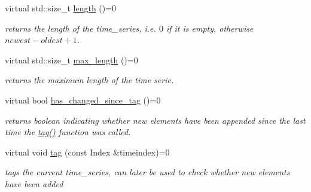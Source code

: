 \begin{DoxyCompactItemize}
\mbox{\label{classtime__series_1_1TimeSeriesInterface_a90f6ed15d82006dbc7ef7783d9f6ff7a}} 
virtual std\+::size\+\_\+t \hyperlink{classtime__series_1_1TimeSeriesInterface_a90f6ed15d82006dbc7ef7783d9f6ff7a}{length} ()=0
\begin{DoxyCompactList}\small\item\em returns the length of the time\+\_\+series, i.\+e. $0$ if it is empty, otherwise $newest - oldest +1 $. \end{DoxyCompactList}\item 
virtual std\+::size\+\_\+t \hyperlink{classtime__series_1_1TimeSeriesInterface_aded8927e82c060aa3367f17dfd59a8ec}{max\+\_\+length} ()=0
\begin{DoxyCompactList}\small\item\em returns the maximum length of the time serie. \end{DoxyCompactList}\item 
\mbox{\label{classtime__series_1_1TimeSeriesInterface_a2758b463ea41393a24ea37ccd0f5feb4}} 
virtual bool \hyperlink{classtime__series_1_1TimeSeriesInterface_a2758b463ea41393a24ea37ccd0f5feb4}{has\+\_\+changed\+\_\+since\+\_\+tag} ()=0
\begin{DoxyCompactList}\small\item\em returns boolean indicating whether new elements have been appended since the last time the \hyperlink{classtime__series_1_1TimeSeriesInterface_a34e881c9496901127baf1d907d7399ac}{tag()} function was called. \end{DoxyCompactList}\item 
\mbox{\label{classtime__series_1_1TimeSeriesInterface_a34e881c9496901127baf1d907d7399ac}} 
virtual void \hyperlink{classtime__series_1_1TimeSeriesInterface_a34e881c9496901127baf1d907d7399ac}{tag} (const Index \&timeindex)=0
\begin{DoxyCompactList}\small\item\em tags the current time\+\_\+series, can later be used to check whether new elements have been added \end{DoxyCompactList}\item 
\mbox{\label{classtime__series_1_1TimeSeriesInterface_aa71ab509ac29c5da681aee9dbf65f2d8}} 

\end{DoxyCompactItemize}
